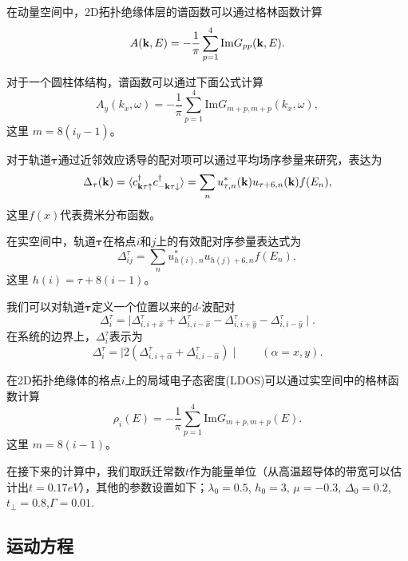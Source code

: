 \qquad 在动量空间中，2D拓扑绝缘体层的谱函数可以通过格林函数计算
\begin{equation}
A({\bf k},E)=-\frac{1}{\pi}\sum^4_{p=1}\mathrm{Im} G_{pp}({\bf k},E).
\end{equation}

\qquad 对于一个圆柱体结构，谱函数可以通过下面公式计算
\begin{equation}
A_{y}(k_{x},\omega)=-\frac{1}{\pi}\sum_{p=1}^{4}\mathrm{Im} G_{m+p,m+p}(k_x,\omega),
\end{equation}
这里 $m = 8(i_y-1)$。

\qquad 对于轨道$\mathbf{\tau}$通过近邻效应诱导的配对项可以通过平均场序参量来研究，表达为
\begin{equation}
\Delta_\tau({\bf k})=\langle c^\dagger_{{\bf k}\tau\uparrow}c^\dagger_{-{\bf k}\tau\downarrow}\rangle=\sum_n{u^{*}_{\tau,n}({\bf k})u_{\tau+6,n}({\bf k})}f(E_n),
\end{equation}
这里$f(x)$代表费米分布函数。

\qquad 在实空间中，轨道$\mathbf{\tau}在$格点$i$和$j$上的有效配对序参量表达式为
\begin{equation}
\Delta^\tau_{ij}=\sum_nu^{*}_{h(i),n}u_{h(j)+6,n}f(E_n),
\end{equation}
这里 $h(i)=\tau+8(i-1)$。

\qquad 我们可以对轨道$\mathbf{\tau}$定义一个位置以来的$d$-波配对
\begin{equation}
\Delta^\tau_i=\mid \Delta^\tau_{i,i+\hat{x}}+\Delta^\tau_{i,i-\hat{x}}
-\Delta^\tau_{i,i+\hat{y}}-\Delta^\tau_{i,i-\hat{y}}\mid.
\end{equation}
在系统的边界上，$\Delta_i^\tau$表示为
\begin{equation}
\Delta^\tau_i=\mid 2(\Delta^\tau_{i,i+\hat{\alpha}}+\Delta^\tau_{i,i-\hat{\alpha}}) \mid  \qquad (\alpha=x,y).
\end{equation}

\qquad 在2D拓扑绝缘体的格点$i$上的局域电子态密度(LDOS)可以通过实空间中的格林函数计算
\begin{equation}
\rho_i(E)=-\frac{1}{\pi}\sum^4_{p=1}\mathrm{Im} G_{m+p,m+p}(E).
\end{equation}
这里 $m=8(i-1)$。

\qquad 在接下来的计算中，我们取跃迁常数$t$作为能量单位（从高温超导体的带宽可以估计出$t=0.17eV$），其他的参数设置如下；$\lambda_0=0.5$, $h_0=3$, $\mu=-0.3$, $\Delta_0=0.2$, $t_\perp=0.8$,$\Gamma=0.01$.
\subsection{运动方程}
